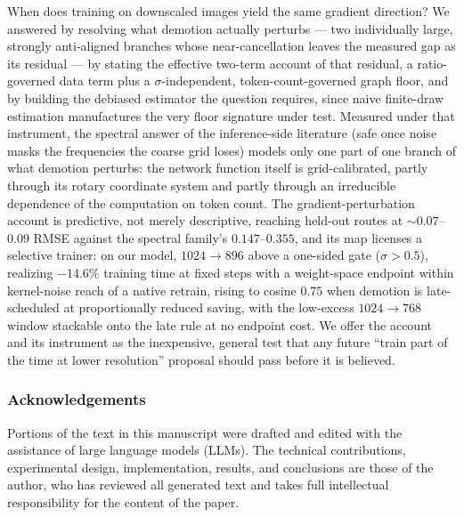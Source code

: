 When does training on downscaled images yield the same gradient
direction? We answered by resolving what demotion actually perturbs
--- two individually large, strongly anti-aligned branches whose
near-cancellation leaves the measured gap as its residual --- by
stating the effective two-term account of that residual, a
ratio-governed data term plus a
$\sigma$-independent, token-count-governed graph floor, and by
building the debiased estimator the question requires, since naive
finite-draw estimation manufactures the very floor signature under
test. Measured under that instrument, the spectral answer of the
inference-side literature (safe once noise masks the frequencies the
coarse grid loses) models only one part of one branch of what
demotion perturbs: the
network function itself is grid-calibrated, partly through its rotary
coordinate system and partly through an irreducible dependence of the
computation on token count. The gradient-perturbation account is predictive, not
merely descriptive, reaching held-out routes at ${\sim}0.07$--$0.09$
RMSE against the spectral family's $0.147$--$0.355$, and its map
licenses a selective trainer: on our model, $1024{\to}896$ above a
one-sided gate ($\sigma > 0.5$),
realizing $-14.6\%$ training time at fixed steps with a weight-space
endpoint within kernel-noise reach of a native retrain, rising to
cosine $0.75$ when demotion is late-scheduled at proportionally
reduced saving, with the low-excess $1024{\to}768$ window stackable
onto the late rule at no endpoint cost. We offer
the account and its instrument as the inexpensive, general test that any
future ``train part of the time at lower resolution'' proposal should
pass before it is believed.

\subsubsection*{Acknowledgements}
Portions of the text in this manuscript were drafted and edited with
the assistance of large language models (LLMs). The technical
contributions, experimental design, implementation, results, and
conclusions are those of the author, who has reviewed all generated
text and takes full intellectual responsibility for the content of
the paper.
